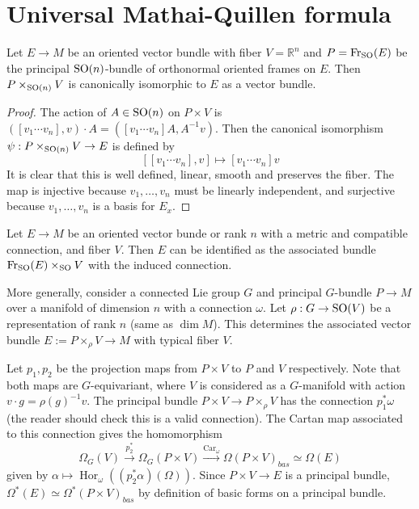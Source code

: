 \section{Universal Mathai-Quillen formula}
\begin{prop}
	Let $E\to M$ be an oriented vector bundle with fiber $V=\mathbb{R}^n$ 
	and  $P=\operatorname{Fr}_{\operatorname{SO}}(E)$ be the
	principal $\operatorname{SO}(n)$-bundle of orthonormal oriented frames on  $E$. Then 
	$P\times_{\operatorname{SO}(n)} V$ is canonically isomorphic to $E$ as a vector bundle. 
\end{prop} 
\begin{proof}
	The action of $A\in\operatorname{SO}(n)$ on $P\times V$ is 
	$
		([v_1 \cdots v_n], v) \cdot A = ([v_1 \cdots v_n] A, A^{-1} v) 
	$.
	Then the canonical isomorphism $\psi : P\times_{\operatorname{SO}(n)} V \to E$ is defined by
	\[
		[[v_1 \cdots v_n], v] \mapsto [v_1 \cdots v_n] v
	\] 
	It is clear that this is well defined, linear, smooth and preserves the
	fiber. The map is injective because $v_1,\ldots,v_n$ must be linearly
	independent, and surjective because $v_1,\ldots,v_n$ is a basis for $E_x$.
\end{proof}
Let $E\to M$ be an oriented vector bunde or rank  $n$ with a
metric and compatible connection, and fiber $V$. 
Then $E$ can be identified as the associated bundle $\operatorname{Fr}_{\operatorname{SO}}(E)\times_{\operatorname{SO}} V$ 
with the induced connection. 

More generally, consider a connected Lie group $G$ and 
principal $G$-bundle  $P\to M$ over a manifold of
dimension $n$ with a connection $\omega$. Let $\rho : G \to \operatorname{SO}(V)$ be a 
representation of rank $n$ (same as $\dim M$). 
This determines the associated vector bundle  $E:=P\times_\rho V \to M$
with typical fiber $V$. 

Let $p_1,p_2$ be the projection maps from $P\times V$ to  $P$ and  $V$
respectively. Note that both maps are $G$-equivariant, where 
$V$ is considered as a $G$-manifold with action $v\cdot g = \rho(g)^{-1} v$.
The principal bundle $P\times V \to P\times_\rho V$ has the connection 
$p_1^*\omega$ (the reader should check this is a valid connection).
The Cartan map associated to this 
connection gives the homomorphism
\[
	\Omega_G(V) \xrightarrow{p_2^*} \Omega_G(P\times V) 
	\xrightarrow{\operatorname{Car}_{\omega}} \Omega(P\times V)_{bas}\simeq
	\Omega(E)
\] 
given by $\alpha \mapsto \operatorname{Hor}_{\omega}((p_2^*\alpha)(\Omega))$. 
Since  $P\times V \to E$ is a principal bundle,
$\Omega^*(E)\simeq \Omega^*(P\times V)_{bas}$ by definition of basic forms on a
principal bundle.

